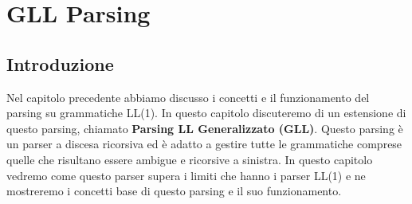 \chapter{GLL Parsing}
\section{Introduzione}
Nel capitolo precedente abbiamo discusso i concetti e il funzionamento del parsing su grammatiche LL(1). In questo capitolo discuteremo di un estensione di questo parsing, chiamato \textbf{Parsing LL Generalizzato (GLL)}. Questo parsing è un parser a discesa ricorsiva ed è adatto a gestire tutte le grammatiche comprese quelle che risultano essere ambigue e ricorsive a sinistra. In questo capitolo vedremo come questo parser supera i limiti che hanno i parser LL(1) e ne mostreremo i concetti base di questo parsing e il suo funzionamento.
